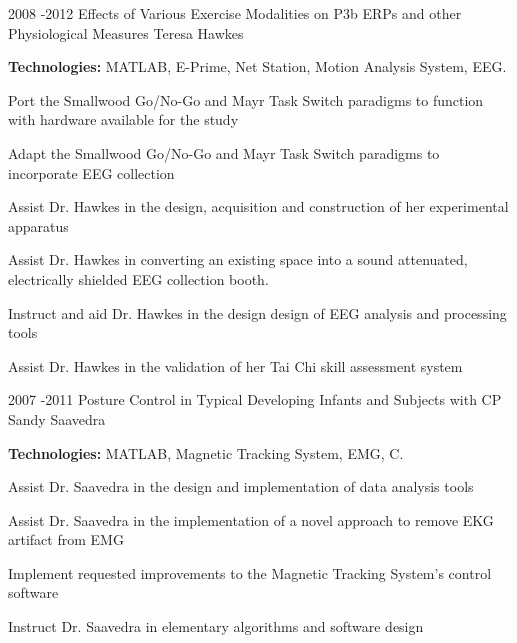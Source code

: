 \documentclass[10pt]{article} %
\begin{document}

\project
{2008 -}{2012}
{Effects of Various Exercise Modalities on P3b ERPs and other Physiological Measures}
{Teresa Hawkes}
{\rule{0mm}{5mm}\textbf{Technologies:} MATLAB, E-Prime, Net Station, Motion Analysis System, EEG.

\begin{itemize-noindent}
\setlength\itemsep{0.12em}
\item{Port the Smallwood Go/No-Go and Mayr Task Switch paradigms to function with hardware available for the study}
\item{Adapt the Smallwood Go/No-Go and Mayr Task Switch paradigms to incorporate EEG collection}
\item{Assist Dr. Hawkes in the design, acquisition and construction of her experimental apparatus}
\item{Assist Dr. Hawkes in converting an existing space into a sound attenuated, electrically shielded EEG collection booth.}
\item{Instruct and aid Dr. Hawkes in the design design of EEG analysis and processing tools}
\item{Assist Dr. Hawkes in the validation of her Tai Chi skill assessment system}
\end{itemize-noindent}

}


\project
{2007 -}{2011}
{ Posture Control in Typical Developing Infants and Subjects with CP}
{Sandy Saavedra}
{\rule{0mm}{5mm}\textbf{Technologies:} MATLAB, Magnetic Tracking System, EMG, C.

\begin{itemize-noindent}
\setlength\itemsep{0.12em}
\item{Assist Dr. Saavedra in the design and implementation of data analysis tools}
\item{Assist Dr. Saavedra in the implementation of a novel approach to remove EKG artifact from EMG}
\item{Implement requested improvements to the Magnetic Tracking System's control software}
\item{Instruct Dr. Saavedra in elementary algorithms and software design}
\end{itemize-noindent}

}

\end{document}
